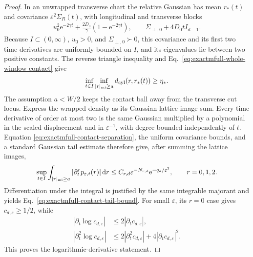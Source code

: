 \documentclass[aps,physrev,onecolumn,amsmath,amssymb,longbibliography]{revtex4-2}
\newcommand{\dd}{\mathrm d}
\newcommand{\e}{\mathrm e}
\begin{document}
\begin{proof}
In an unwrapped transverse chart the relative Gaussian has mean \(r_*(t)\)
and covariance \(\varepsilon^2\Sigma_R(t)\), with longitudinal and transverse
blocks
\begin{align}
 u_0^2\e^{-2\gamma t}
 +\frac{2D_0}{\gamma}(1-\e^{-2\gamma t}),
 \qquad
 \Sigma_{\perp,0}+4D_0t I_{d-1}.
 \label{eq:exactmfull-relative-covariance}
\end{align}
Because \(I\subset(0,\infty)\), \(u_0>0\), and
\(\Sigma_{\perp,0}\succ0\), this covariance and its first two time
derivatives are uniformly bounded on \(I\), and its eigenvalues lie between
two positive constants.  The reverse triangle inequality and
Eq.~\eqref{eq:exactmfull-whole-window-contact} give
\begin{equation}
 \inf_{t\in I}\inf_{|r|_{\rm mi}\ge a}
 d_{\rm cyl}(r,r_*(t))\ge\eta_*.
 \label{eq:exactmfull-contact-separation}
\end{equation}
The assumption \(a<W/2\) keeps the contact ball away from the transverse cut
locus.  Express the wrapped density as its Gaussian lattice-image sum.
Every time derivative of order at most two is the same Gaussian multiplied
by a polynomial in the scaled displacement and in \(\varepsilon^{-1}\),
with degree bounded independently of \(t\).  Equation
\eqref{eq:exactmfull-contact-separation}, the uniform covariance bounds, and
a standard Gaussian tail estimate therefore give, after summing the lattice
images,
\begin{equation}
 \sup_{t\in I}\int_{|r|_{\rm mi}\ge a}
 |\partial_t^r p_{\varepsilon,t}(r)|\,\dd r
 \le C_{r,d}\varepsilon^{-N_{r,d}}
       \e^{-q_d/\varepsilon^2},
 \qquad r=0,1,2.
 \label{eq:exactmfull-density-tail}
\end{equation}
Differentiation under the integral is justified by the same integrable
majorant and yields Eq.~\eqref{eq:exactmfull-contact-tail-bound}.  For small
\(\varepsilon\), its \(r=0\) case gives \(c_{d,\varepsilon}\ge1/2\), while
\begin{align}
 |\partial_t\log c_{d,\varepsilon}|
 &\le2|\partial_t c_{d,\varepsilon}|,\nonumber\\
 |\partial_t^2\log c_{d,\varepsilon}|
 &\le2|\partial_t^2c_{d,\varepsilon}|
      +4|\partial_tc_{d,\varepsilon}|^2.
 \label{eq:exactmfull-log-contact-bounds}
\end{align}
This proves the logarithmic-derivative statement.
\end{proof}
\end{document}
